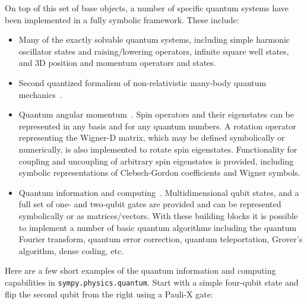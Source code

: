 On top of this set of base objects, a number of specific quantum systems have
been implemented in a fully symbolic framework. These include:

\begin{itemize}

\item Many of the exactly solvable quantum systems, including simple harmonic
oscillator states and raising/lowering operators, infinite square well states,
and 3D position and momentum operators and states.

\item Second quantized formalism of non-relativistic many-body quantum
mechanics~\cite{FetterWalecka2003}.

\item Quantum angular momentum~\cite{Zare1991}. Spin operators and their
eigenstates can be represented in any basis and for any quantum numbers.
A rotation operator representing the Wigner-D matrix, which may be defined
symbolically or numerically, is also implemented to rotate spin eigenstates.
Functionality for coupling and uncoupling of arbitrary spin eigenstates is
provided, including symbolic representations of Clebsch-Gordon coefficients and
Wigner symbols.

\item Quantum information and computing~\cite{Nielsen2011}. Multidimensional
qubit states, and a full set of one- and two-qubit gates are provided and can
be represented symbolically or as matrices/vectors. With these building blocks
it is possible to implement a number of basic quantum algorithms including the
quantum Fourier transform, quantum error correction, quantum teleportation,
Grover's algorithm, dense coding, etc.


\end{itemize}

Here are a few short examples of the quantum information and computing capabilities
in \verb|sympy.physics.quantum|. Start with a simple four-qubit state and flip the second
qubit from the right using a Pauli-X gate:

